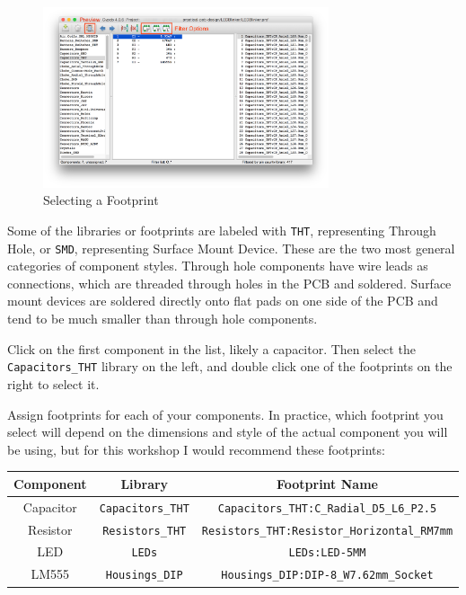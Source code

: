 \documentclass[12pt, oneside]{article}
\begin{document}
\begin{figure}[H]
\includegraphics[width=0.75\textwidth]{CVPcb}
\centering
\caption{Selecting a Footprint}
\end{figure}

Some of the libraries or footprints are labeled with \texttt{THT}, representing Through Hole, or \texttt{SMD}, representing Surface Mount Device. These are the two most general categories of component styles. Through hole components have wire leads as connections, which are threaded through holes in the PCB and soldered. Surface mount devices are soldered directly onto flat pads on one side of the PCB and tend to be much smaller than through hole components.

Click on the first component in the list, likely a capacitor. Then select the \texttt{Capacitors\_THT} library on the left, and double click one of the footprints on the right to select it. 

Assign footprints for each of your components. In practice, which footprint you select will depend on the dimensions and style of the actual component you will be using, but for this workshop I would recommend these footprints: 

\begin{tabular}{|c|c|c|}
\hline 
\textbf{Component} & \textbf{Library} & \textbf{Footprint Name} \\ 
\hline 
Capacitor & \texttt{Capacitors\_THT} & \texttt{Capacitors\_THT:C\_Radial\_D5\_L6\_P2.5} \\ 
\hline 
Resistor & \texttt{Resistors\_THT} & \texttt{Resistors\_THT:Resistor\_Horizontal\_RM7mm} \\ 
\hline 
LED & \texttt{LEDs} & \texttt{LEDs:LED-5MM} \\ 
\hline 
LM555 & \texttt{Housings\_DIP} & \texttt{Housings\_DIP:DIP-8\_W7.62mm\_Socket} \\ 
\hline 
\end{tabular}
\end{document}
